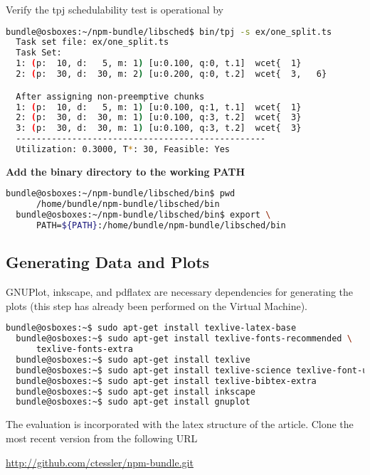 \documentclass[a4paper]{article}
\begin{document}
{\noindent}Verify the tpj schedulability test is operational by
\begin{lstlisting}[language=bash]
  bundle@osboxes:~/npm-bundle/libsched$ bin/tpj -s ex/one_split.ts
  Task set file: ex/one_split.ts
  Task Set:
  1: (p:  10, d:   5, m: 1) [u:0.100, q:0, t.1]  wcet{  1}
  2: (p:  30, d:  30, m: 2) [u:0.200, q:0, t.2]  wcet{  3,   6}

  After assigning non-preemptive chunks
  1: (p:  10, d:   5, m: 1) [u:0.100, q:1, t.1]  wcet{  1}
  2: (p:  30, d:  30, m: 1) [u:0.100, q:3, t.2]  wcet{  3}
  3: (p:  30, d:  30, m: 1) [u:0.100, q:3, t.2]  wcet{  3}
  -------------------------------------------------
  Utilization: 0.3000, T*: 30, Feasible: Yes
\end{lstlisting}

{\noindent}\textbf{Add the binary directory to the working PATH}
\begin{lstlisting}[language=bash]
  bundle@osboxes:~/npm-bundle/libsched/bin$ pwd
      /home/bundle/npm-bundle/libsched/bin
  bundle@osboxes:~/npm-bundle/libsched/bin$ export \
      PATH=${PATH}:/home/bundle/npm-bundle/libsched/bin
\end{lstlisting}

\subsection{Generating Data and Plots}

GNUPlot, inkscape, and pdflatex are necessary dependencies for
generating the plots (this step has already been performed on the
Virtual Machine). 

\begin{lstlisting}[language=bash]
  bundle@osboxes:~$ sudo apt-get install texlive-latex-base
  bundle@osboxes:~$ sudo apt-get install texlive-fonts-recommended \
      texlive-fonts-extra
  bundle@osboxes:~$ sudo apt-get install texlive
  bundle@osboxes:~$ sudo apt-get install texlive-science texlive-font-utils
  bundle@osboxes:~$ sudo apt-get install texlive-bibtex-extra
  bundle@osboxes:~$ sudo apt-get install inkscape
  bundle@osboxes:~$ sudo apt-get install gnuplot
\end{lstlisting}

The evaluation is incorporated with the latex structure of the
article. Clone the most recent version from the following URL

\href{http://github.com/ctessler/npm-bundle.git}{http://github.com/ctessler/npm-bundle.git}
\end{document}
